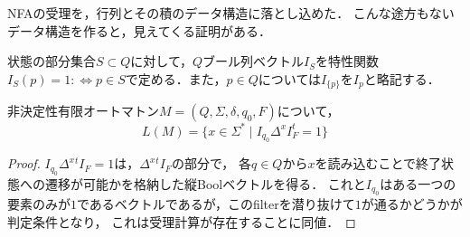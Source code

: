 \documentclass[uplatex, dvipdfmx]{jsreport}
\begin{document}
\begin{tcolorbox}[colframe=ForestGreen, colback=ForestGreen!10!white, breakable]
    NFAの受理を，行列とその積のデータ構造に落とし込めた．
    こんな途方もないデータ構造を作ると，見えてくる証明がある．
\end{tcolorbox}

\begin{notation}
    状態の部分集合$S\subset Q$に対して，$Q$ブール列ベクトル$I_S$を特性関数$I_S(p)=1:\Leftrightarrow p\in S$で定める．また，$p\in Q$については$I_{\{p\}}$を$I_p$と略記する．
\end{notation}

\begin{corollary}
    非決定性有限オートマトン$M=(Q,\Sigma,\delta,q_0,F)$について，
    \[ L(M)=\{x\in\Sigma^*\mid I_{q_0}\Delta^xI^t_F=1\} \]
\end{corollary}
\begin{proof}
    $I_{q_0}\Delta^x{}^t\!I_F=1$は，$\Delta^x{}^t\!I_F$の部分で，
    各$q\in Q$から$x$を読み込むことで終了状態への遷移が可能かを格納した縦Boolベクトルを得る．
    これと$I_{q_0}$はある一つの要素のみが$1$であるベクトルであるが，このfilterを潜り抜けて$1$が通るかどうかが判定条件となり，
    これは受理計算が存在することに同値．
\end{proof}
\end{document}
